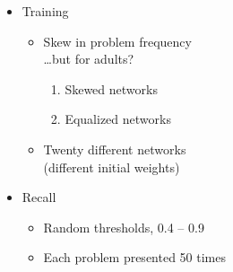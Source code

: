 \begin{slide*}

\vspace{2mm}



\end{slide*}


\begin{slide*}


\begin{itemize}

\item Training

\begin{itemize}
\item Skew in problem frequency\\
\ldots but for adults?

\begin{enumerate}
\item Skewed networks
\item Equalized networks
\end{enumerate}

\item Twenty different networks\\
(different initial weights)
\end{itemize}

\item Recall

\begin{itemize}
\item Random thresholds, 0.4 -- 0.9
\item Each problem presented 50 times
\end{itemize}

\end{itemize}
\end{slide*}


\begin{slide*}

\end{slide*}

\begin{slide*}

\end{slide*}



